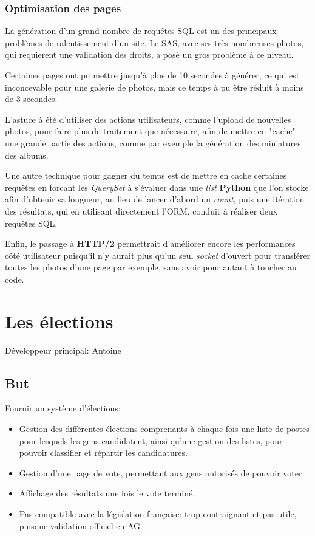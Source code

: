 \documentclass[a4paper]{report}
\begin{document}
\subsection{Optimisation des pages}
\label{sub:optimisation_des_pages}
\par La génération d'un grand nombre de requêtes SQL est un des principaux problèmes de ralentissement d'un site. Le
SAS, avec ses très nombreuses photos, qui requierent une validation des droits, a posé un gros problème à ce niveau.

\par Certaines pages ont pu mettre jusqu'à plus de 10 secondes à générer, ce qui est inconcevable pour une galerie de
photos, mais ce temps à pu être réduit à moins de 3 secondes.

\par L'astuce à été d'utiliser des actions utilisateurs, comme l'upload de nouvelles photos, pour faire plus de
traitement que nécessaire, afin de mettre en "cache" une grande partie des actions, comme par exemple la génération des
miniatures des albums.

\par Une autre technique pour gagner du temps est de mettre en cache certaines requêtes en forcant les \emph{QuerySet}
à s'évaluer dans une \emph{list} \textbf{Python} que l'on stocke afin d'obtenir sa longueur, au lieu de lancer d'abord
un \emph{count}, puis une itération des résultats, qui en utilisant directement l'ORM, conduit à réaliser deux
requêtes SQL.

\par Enfin, le passage à \textbf{HTTP/2} permettrait d'améliorer encore les performances côté utilisateur puisqu'il n'y
aurait plus qu'un seul \emph{socket} d'ouvert pour transférer toutes les photos d'une page par exemple, sans avoir
pour autant à toucher au code.


\chapter{Les élections}
\label{sec:les_elections}
\par Développeur principal: Antoine

\section{But}
\label{sub:but}
\par Fournir un système d'élections:
\begin{itemize}
    \item Gestion des différentes élections comprenants à chaque fois une liste de postes pour lesquels les gens
        candidatent, ainsi qu'une gestion des listes, pour pouvoir classifier et répartir les candidatures.
    \item Gestion d'une page de vote, permettant aux gens autorisés de pouvoir voter.
    \item Affichage des résultats une fois le vote terminé.
    \item Pas compatible avec la législation française: trop contraignant et pas utile, puisque validation officiel en
        AG.
\end{itemize}
\end{document}
